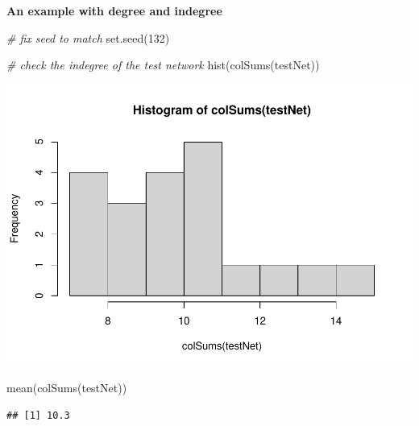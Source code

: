\documentclass[
]{article}
\newenvironment{Shaded}{\begin{snugshade}}{\end{snugshade}}
\newcommand{\CommentTok}[1]{\textcolor[rgb]{0.56,0.35,0.01}{\textit{#1}}}
\newcommand{\DecValTok}[1]{\textcolor[rgb]{0.00,0.00,0.81}{#1}}
\newcommand{\FunctionTok}[1]{\textcolor[rgb]{0.00,0.00,0.00}{#1}}
\newcommand{\NormalTok}[1]{#1}
\begin{document}
\textbf{An example with degree and indegree}

\begin{Shaded}
\begin{Highlighting}[]
\CommentTok{\# fix seed to match}
\FunctionTok{set.seed}\NormalTok{(}\DecValTok{132}\NormalTok{)}

\CommentTok{\# check the indegree of the test network}
\FunctionTok{hist}\NormalTok{(}\FunctionTok{colSums}\NormalTok{(testNet))}
\end{Highlighting}
\end{Shaded}

\includegraphics{20220404_miss_data_model_files/figure-latex/example with multiple predictors-1.pdf}

\begin{Shaded}
\begin{Highlighting}[]
\FunctionTok{mean}\NormalTok{(}\FunctionTok{colSums}\NormalTok{(testNet))}
\end{Highlighting}
\end{Shaded}

\begin{verbatim}
## [1] 10.3
\end{verbatim}
\end{document}
